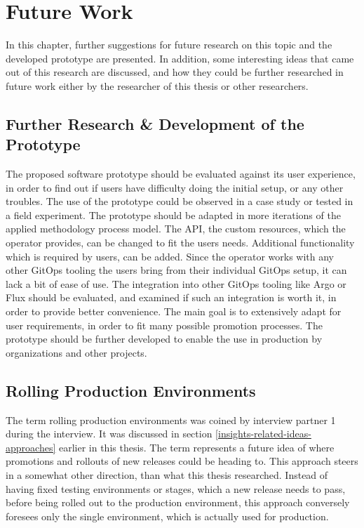 \chapter{Future Work}
\label{future-work}

In this chapter,
further suggestions for future research on this topic and the developed prototype are presented.
In addition,
some interesting ideas that came out of this research are discussed,
and how they could be further researched in future work either by the researcher of this thesis or other researchers.



\section*{Further Research \& Development of the Prototype}

The proposed software prototype should be evaluated against its user experience,
in order to find out if users have difficulty doing the initial setup,
or any other troubles.
The use of the prototype could be observed in a case study or tested in a field experiment.
The prototype should be adapted in more iterations of the applied methodology process model.
%
The API, the custom resources, which the operator provides, can be changed to fit the users needs.
Additional functionality which is required by users, can be added.
Since the operator works with any other GitOps tooling the users bring from their individual GitOps setup,
it can lack a bit of ease of use. The integration into other GitOps tooling like Argo or Flux
should be evaluated, and examined if such an integration is worth it, in order to provide better convenience.
%
The main goal is to extensively adapt for user requirements, in order to fit
many possible promotion processes.
The prototype should be further developed to enable the use in production by organizations and other projects.

\section*{Rolling Production Environments}

The term rolling production environments was coined by interview partner 1 during the interview.
It was discussed in section \ref{insights-related-ideas-approaches} earlier in this thesis.
The term represents a future idea of where promotions and rollouts of new releases could be heading to.
This approach steers in a somewhat other direction, than what this thesis researched.
Instead of having fixed testing environments or stages, which a new release needs to pass,
before being rolled out to the production environment,
this approach conversely foresees only the single environment,
which is actually used for production.

